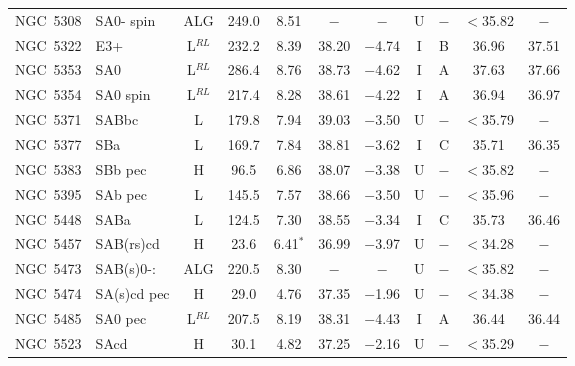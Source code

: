 \begin{center}
\begin{longtable}{lC{2.5cm}ccccccccc}
NGC~5308 & SA0- spin      & ALG               & 249.0   & 8.51                & $-$      & $-$          & U   &$-$       & $<$35.82 & $-$            \\
NGC~5322 & E3+             & L$^{RL}$            & 232.2 & 8.39                & 38.20    & $-$4.74       & I   & B        & 36.96    & 37.51         \\
NGC~5353  & SA0             &   L$^{RL}$         &   286.4      &   8.76       &   38.73   & $-$4.62    &   I  & A   &  37.63     &  37.66   \\
NGC~5354 & SA0 spin        & L$^{RL}$                 & 217.4 & 8.28                 & 38.61    & $-$4.22       & I   & A        & 36.94    & 36.97              \\
NGC~5371  & SABbc           &   L             &  179.8   &  7.94              &  39.03   &  $-$3.50   &   U & $-$      & $<$35.79 & $-$  \\
NGC~5377  & SBa              &   L              &   169.7    &  7.84             &  38.81   &  $-$3.62   &  I & C  &  35.71  &  36.35    \\
NGC~5383  & SBb pec       &  H              &   96.5      &  6.86             &  38.07   & $-$3.38     &   U &  $-$      & $<$35.82 & $-$  \\
NGC~5395  & SAb pec       &   L             &   145.5     &  7.57            &  38.66   &  $-$3.50    &   U & $-$      & $<$35.96 & $-$  \\
NGC~5448  & SABa            &    L            &   124.5     &  7.30           &   38.55  &  $-$3.34    &  I   & C   &  35.73   & 36.46  \\
NGC~5457 & SAB(rs)cd         & H                 & 23.6  & 6.41$^{*}$          & 36.99    & $-$3.97       & U   &$-$       & $<$34.28 & $-$           \\
NGC~5473 & SAB(s)0-:       & ALG               & 220.5 & 8.30                & $-$      & $-$            & U   &$-$       &  $<$35.82 & $-$           \\
NGC~5474 & SA(s)cd pec       & H                 & 29.0    & 4.76                & 37.35    & $-$1.96       & U   &$-$       & $<$34.38 & $-$            \\
NGC~5485 & SA0 pec           & L$^{RL}$            & 207.5 & 8.19                 & 38.31    & $-$4.43      & I   & A        & 36.44    & 36.44         \\
NGC~5523  & SAcd             &  H         &   30.1     &   4.82            &   37.25    &  $-$2.16      & U   &  $-$      & $<$35.29 & $-$ \\

\end{longtable}
\end{center}
